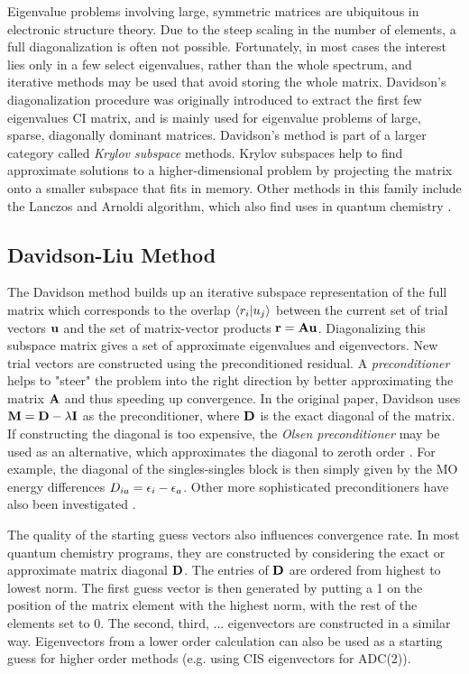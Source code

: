 Eigenvalue problems involving large, symmetric matrices are ubiquitous in electronic structure theory. Due to the steep scaling in the number of elements, a full diagonalization is often not possible. Fortunately, in most cases the interest lies only in a few select eigenvalues, rather than the whole spectrum, and iterative methods may be used that avoid storing the whole matrix. Davidson's diagonalization procedure \cite{Dav1975} was originally introduced to extract the first few eigenvalues CI matrix, and is mainly used for eigenvalue problems of large, sparse, diagonally dominant matrices. Davidson's method is part of a larger category called \emph{Krylov subspace} methods. Krylov subspaces help to find approximate solutions to a higher-dimensional problem by projecting the matrix onto a smaller subspace that fits in memory. Other methods in this family include the Lanczos and Arnoldi algorithm, which also find uses in quantum chemistry \cite{Cor2012}.

\subsection{Davidson-Liu Method}

The Davidson method builds up an iterative subspace representation of the full matrix which corresponds to the overlap $\bra{\smash{r_i}}\ket{\smash{u_j}}$ between the current set of trial vectors $\mathbf{u}$ and the set of matrix-vector products $\mathbf{r} = \mathbf{A} \mathbf{u}$. Diagonalizing this subspace matrix gives a set of approximate eigenvalues and eigenvectors. New trial vectors are constructed using the preconditioned residual. A \emph{preconditioner} helps to "steer" the problem into the right direction by better approximating the matrix $\mathbf{A}$ and thus speeding up convergence. In the original paper, Davidson uses $\mathbf{M} = \mathbf{D} - \lambda \mathbf{I}$ as the preconditioner, where $\mathbf{D}$ is the exact diagonal of the matrix. If constructing the diagonal is too expensive, the \emph{Olsen preconditioner} may be used as an alternative, which approximates the diagonal to zeroth order \cite{Ols1990}. For example, the diagonal of the singles-singles block is then simply given by the MO energy differences $D_{ia} = \epsilon_i - \epsilon_a$. Other more sophisticated preconditioners have also been investigated \cite{Mor1990}. 

The quality of the starting guess vectors also influences convergence rate. In most quantum chemistry programs, they are constructed by considering the exact or approximate matrix diagonal $\mathbf{D}$. The entries of $\mathbf{D}$ are ordered from highest to lowest norm. The first guess vector is then generated by putting a 1 on the position of the matrix element with the highest norm, with the rest of the elements set to 0. The second, third, ... eigenvectors are constructed in a similar way. Eigenvectors from a lower order calculation can also be used as a starting guess for higher order methods (e.g. using CIS eigenvectors for ADC(2)). 


